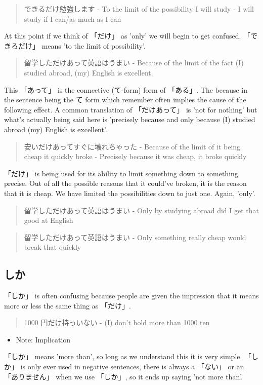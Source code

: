 \documentclass[11pt]{article}
\begin{document}
\begin{quote}
できるだけ勉強します - To the limit of the possibility I will study - I will study if I can/as much as I can
\end{quote}
At this point if we think of 「だけ」 as 'only' we will begin to get confused. 「できろだけ」 means 'to the limit of possibility'.

\begin{quote}
留学しただけあって英語はうまい - Because of the limit of the fact (I) studied abroad, (my) English is excellent.
\end{quote}
This 「あって」 is the connective (て-form) form of 「ある」. The because in the sentence being the て form which remember often implies the cause of the following effect. A common translation of 「だけあって」 is 'not for nothing' but what's actually being said here is 'precisely because and only because (I) studied abroad (my) English is excellent'.

\begin{quote}
安いだけあってすぐに壊れちゃった - Because of the limit of it being cheap it quickly broke - Precisely because it was cheap, it broke quickly
\end{quote}
「だけ」 is being used for its ability to limit something down to something precise. Out of all the possible reasons that it could've broken, it is the reason that it is cheap. We have limited the possibilities down to just one. Again, 'only'.
\begin{quote}
留学しただけあって英語はうまい - Only by studying abroad did I get that good at English
\end{quote}
\begin{quote}
留学しただけあって英語はうまい - Only something really cheap would break that quickly
\end{quote}

\subsection{しか}
\label{sec:org2ab825b}
「しか」 is often confusing because people are given the impression that it means more or less the same thing as 「だけ」.
\begin{quote}
1000 円だけ持っいない - (I) don't hold more than 1000 ten
\end{quote}
\begin{itemize}
\item Note: Implication
\end{itemize}
「しか」 means 'more than', so long as we understand this it is very simple. 「しか」 is only ever used in negative sentences, there is always a 「ない」 or an 「ありません」 when we use 「しか」, so it ends up saying 'not more than'.
\end{document}
